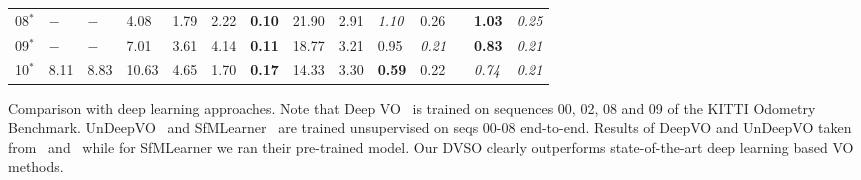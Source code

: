 \documentclass[runningheads]{llncs}
\begin{document}
\begin{tabular}{C{0.8cm}|C{0.8cm}C{0.8cm}|C{0.8cm}C{0.8cm}|C{0.8cm}C{0.8cm}|C{0.8cm}C{0.8cm}|C{0.75cm}C{0.75cm}|C{2pt}|C{0.8cm}C{0.8cm}}
		08$^\ast$   & $-$ & $-$ & 4.08 & 1.79
		& 2.22 & \textbf{0.10} 
		& 21.90 & 2.91
		&\textit{1.10}& 0.26&&\textbf{1.03} & \textit{0.25}\\
		
		09$^\ast$&$-$& $-$ & 7.01 & 3.61
		& 4.14 & \textbf{0.11} 
		&18.77 &3.21
		&0.95&\textit{0.21}&&\textbf{0.83} & \textit{0.21}\\
		
		10$^\ast$   & 8.11 & 8.83 & 10.63 & 4.65
		& 1.70 & \textbf{0.17} 
		&14.33 &3.30 
		&\textbf{0.59}&0.22&&\textit{0.74} & \textit{0.21}\\
		\hline
	\end{tabular}
	\caption{Comparison with deep learning approaches. Note that Deep 
		VO~\cite{wang2017deepvo} is trained on sequences 00, 02, 08 and 09 of 
		the KITTI Odometry Benchmark. UnDeepVO~\cite{li2017undeepvo} and 
		SfMLearner~\cite{zhou2017unsupervised} are trained unsupervised on 
		seqs 00-08 end-to-end. Results of DeepVO and UnDeepVO taken from~\cite{wang2017deepvo} and~\cite{li2017undeepvo} 
		while for SfMLearner we ran their 
		pre-trained model. Our DVSO clearly outperforms state-of-the-art deep learning 
		based VO methods.}
	\label{tab:compare_deep}
\end{document}
